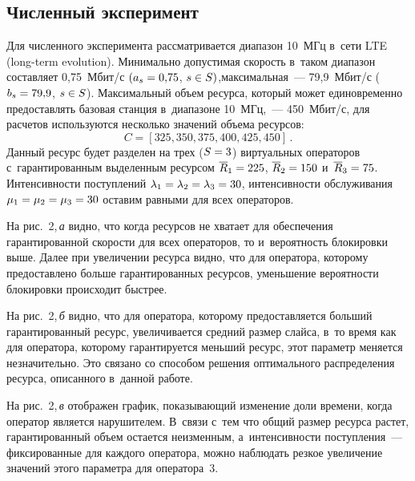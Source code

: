 \begin{multicols}{2}
\vspace*{-8pt}

  
  \section{Численный эксперимент}
  
  \vspace*{-2pt}
  
  Для численного эксперимента рассматривается диапазон 10~МГц в~сети LTE
  (long-term evolution). 
Минимально допустимая скорость в~таком диапазон составляет 0,75~Мбит/с 
$(a_s\hm=0{,}75$, $s\hm\in S)$,\linebreak максимальная~--- 79,9~Мбит/с ($b_s\hm= 
79{,}9$, $s\hm\in S$). Максимальный объем ресурса, который может 
единовременно предоставлять базовая станция в~диапазоне 10~МГц,~--- 
450~Мбит/с, для расчетов используются несколько значений объема ресурсов: 
$$
C= [325,350,375,400,425,450]\,.
$$
 Данный ресурс будет разделен на трех 
($S\hm=3$) виртуальных операторов с~гарантированным выделенным ресурсом 
$\overline{R}_1\hm=225$, $\overline{R}_2\hm= 150$ и~$\overline{R}_3\hm= 75$. 
Интенсивности поступлений $\lambda_1\hm= \lambda_2\hm= \lambda_3\hm=30$, 
интенсивности обслуживания $\mu_1\hm= \mu_2\hm= \mu_3\hm= 30$ оставим 
равными для всех операторов.
  
  На рис.~2,\,\textit{а} видно, что когда ресурсов не хватает для обеспечения 
гарантированной скорости для всех операторов, то и~вероятность блокировки 
выше. Далее при увеличении ресурса видно, что для оператора, которому 
предоставлено больше гарантированных ресурсов, уменьшение вероятности 
блокировки происходит быстрее.
  

  На рис.~2,\,\textit{б} видно, что для оператора, которому предоставляется больший 
гарантированный ресурс, увеличивается средний размер слайса, в~то время как 
для оператора, которому гарантируется меньший ресурс, этот параметр 
меняется незначительно. Это связано со способом решения оптимального 
распределения ресурса, описанного в~данной работе.
  
  На рис.~2,\,\textit{в} отображен график, показывающий изменение доли времени, когда 
оператор является нарушителем. В~связи с~тем что общий размер \mbox{ресурса} 
растет, гарантированный объем остается неизменным, а~интенсивности 
поступления~--- фиксированные для каждого оператора, можно наблюдать 
резкое увеличение значений этого параметра для оператора~3.
  
   
\vspace*{-8pt}


\end{multicols}
